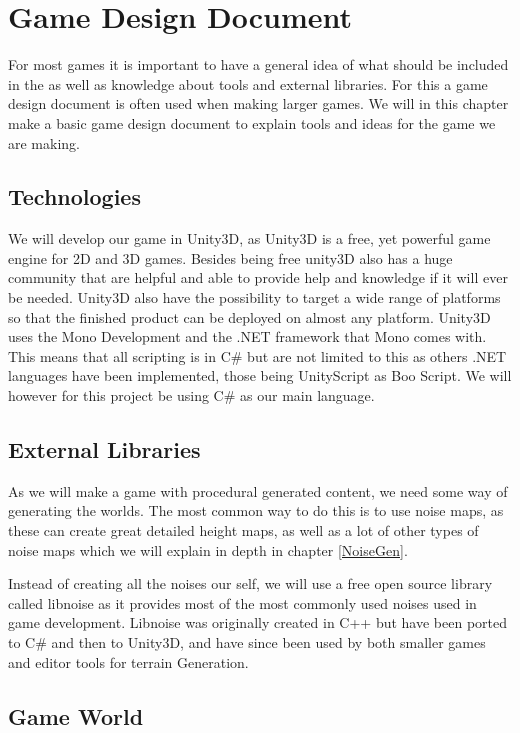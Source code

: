 \chapter{Game Design Document}

For most games it is important to have a general idea of what should be included in the as well as knowledge about tools and external libraries. For this a game design document is often used when making larger games. We will in this chapter make a basic game design document to explain tools and ideas for the game we are making.


\section{Technologies}

We will develop our game in Unity3D\cite{Unity3D}, as Unity3D is a free, yet powerful game engine for 2D and 3D games. Besides being free unity3D also has a huge community that are helpful and able to provide help and knowledge if it will ever be needed. Unity3D also have the possibility to target a wide range of platforms so that the finished product can be deployed on almost any platform. Unity3D uses the Mono Development and the .NET framework that Mono comes with. This means that all scripting is in C\# but are not limited to this as others .NET languages have been implemented, those being UnityScript as Boo Script. We will however for this project be using C\# as our main language.


\section{External Libraries}

As we will make a game with procedural generated content, we need some way of generating the worlds. The most common way to do this is to use noise maps, as these can create great detailed height maps, as well as a lot of other types of noise maps which we will explain in depth in chapter \ref{NoiseGen}.

Instead of creating all the noises our self, we will use a free open source library called libnoise as it provides most of the most commonly used noises used in game development. Libnoise was originally created in C++ but have been ported to C\# and then to Unity3D, and have since been used by both smaller games and editor tools for terrain Generation.


\section{Game World}


